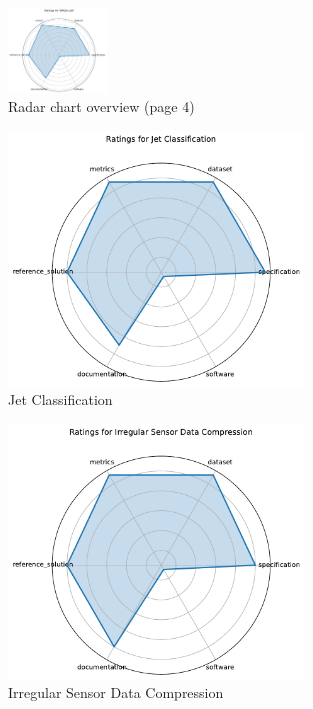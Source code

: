 \documentclass{article}
\begin{document}
\clearpage

\begin{figure}[ht!]
\centering
\includegraphics[width=0.2333\textwidth]{SPIQA LLM_radar.pdf}
\caption{Radar chart overview (page 4)}
\end{figure}


\begin{figure}[h!]
  \centering
  \includegraphics[width=0.7\textwidth]{Jet Classification_radar.pdf}
  \caption{Jet Classification}
\end{figure}

\begin{figure}[h!]
  \centering
  \includegraphics[width=0.7\textwidth]{Irregular Sensor Data Compression_radar.pdf}
  \caption{Irregular Sensor Data Compression}
\end{figure}
\end{document}
